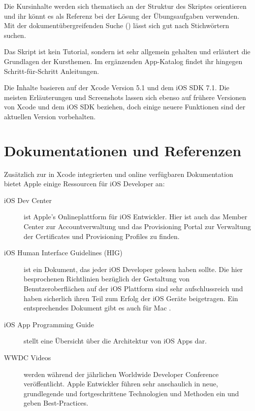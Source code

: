 \documentclass[parskip=half, final]{scrreprt}
\newcommand{\vxcode}{5.1}
\newcommand{\vios}{7.1}
\begin{document}
Die Kursinhalte werden sich thematisch an der Struktur des Skriptes orientieren und ihr könnt es als Referenz bei der Lösung der Übungsaufgaben verwenden. Mit der dokumentübergreifenden Suche () lässt sich gut nach Stichwörtern suchen.

Das Skript ist kein Tutorial, sondern ist sehr allgemein gehalten und erläutert die Grundlagen der Kursthemen. Im ergänzenden App-Katalog findet ihr hingegen Schritt-für-Schritt Anleitungen.

Die Inhalte basieren auf der Xcode Version \vxcode{} und dem iOS SDK \vios{}. Die meisten Erläuterungen und Screenshots lassen sich ebenso auf frühere Versionen von Xcode und dem iOS SDK beziehen, doch einige neuere Funktionen sind der aktuellen Version vorbehalten.

\section{Dokumentationen und Referenzen}\label{sec:docs}

Zusätzlich zur in Xcode integrierten und online verfügbaren Dokumentation  bietet Apple einige Ressourcen für iOS Developer an:

\begin{description}
\item[iOS Dev Center]  ist Apple's Onlineplattform für iOS Entwickler. Hier ist auch das Member Center zur Accountverwaltung und das Provisioning Portal zur Verwaltung der Certificates und Provisioning Profiles  zu finden.
\item[iOS Human Interface Guidelines (HIG)]  ist ein Dokument, das jeder iOS Developer gelesen haben sollte. Die hier besprochenen Richtlinien bezüglich der Gestaltung von Benutzeroberflächen auf der iOS Plattform sind sehr aufschlussreich und haben sicherlich ihren Teil zum Erfolg der iOS Geräte beigetragen. Ein entsprechendes Dokument gibt es auch für Mac .
\item[iOS App Programming Guide]  stellt eine Übersicht über die Architektur von iOS Apps dar.
\item[WWDC Videos]  werden während der jährlichen Worldwide Developer Conference veröffentlicht. Apple Entwickler führen sehr anschaulich in neue, grundlegende und fortgeschrittene Technologien und Methoden ein und geben Best-Practices.
\end{description}
\end{document}
